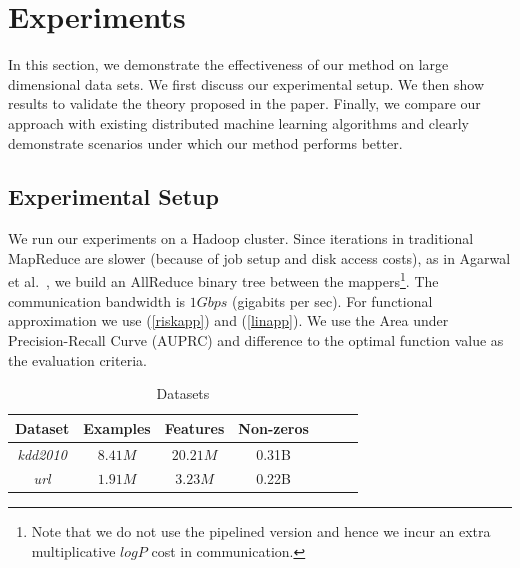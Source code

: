 \section{Experiments}
\label{expts}

\def\grad{\nabla}
\def\wtilde{\tilde{w}}
\def\Cone{{\cal{C}}^1}
\def\kappap{\kappa^\prime}
\def\Lhat{\hat{L}}
\def\fhat{\hat{f}}
\def\what{\hat{w}}
\def\dhat{\hat{d}}
\def\mysgn{\operatorname{sgn}}




In this section, we demonstrate the effectiveness of our method on large dimensional data sets. We first discuss our experimental setup. We then show results
to validate the theory proposed in the paper. Finally, we compare our approach with existing distributed machine learning algorithms and clearly demonstrate scenarios under which our method performs better.

\subsection{Experimental Setup}
We run our experiments on a Hadoop cluster. Since iterations in traditional MapReduce are slower (because of job setup and disk access costs), as in Agarwal et al.~, we build an AllReduce binary tree between the mappers\footnote{Note that we do not use the pipelined version and hence we incur an extra multiplicative $logP$ cost in communication.}. The communication bandwidth is $1 Gbps$ (gigabits per sec).  For functional approximation we use (\ref{riskapp}) and (\ref{linapp}). We use the Area under Precision-Recall Curve (AUPRC) and difference to the optimal function value as the evaluation criteria.\vspace{0.1in} \\

\begin{table}[ht]
\caption{Datasets} %
\centering %
\begin{tabular}{c c c c c c c} %
\hline\hline %
Dataset & Examples & Features & Non-zeros\\ %
\hline 
{\it{kdd2010}} & $8.41M$ & $20.21M$ & 0.31B\\
{\it{url }} & $1.91M$ &  $3.23M$ &  0.22B\\
\hline 
\end{tabular}
\label{tab:params}
\end{table}

